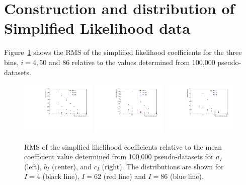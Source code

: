\documentclass[11pt]{article}
\begin{document}


\section{Construction and distribution of Simplified Likelihood data}


Figure~\ref{fig:SLConvergence} shows the RMS of the simplified likelihood
coefficients for the three bins, $i=4,50$ and $86$ relative to the values
determined from 100,000 pseudo-datasets.

\begin{figure}%
  \centering
  \includegraphics[width=0.32\textwidth]{figures/varAll_A}
  \includegraphics[width=0.32\textwidth]{figures/varAll_B}
  \includegraphics[width=0.32\textwidth]{figures/varAll_C}
  \caption{RMS of the simplfied likelihood coefficients relative to the mean
    coefficient value determined from 100,000 pseudo-datasets for $a_{I}$
    (left), $b_{I}$ (center), and $c_{I}$ (right). The distributions are shown
    for $I=4$ (black line), $I=62$ (red line) and $I=86$ (blue line).}
  \label{fig:SLConvergence}
\end{figure}
\end{document}
